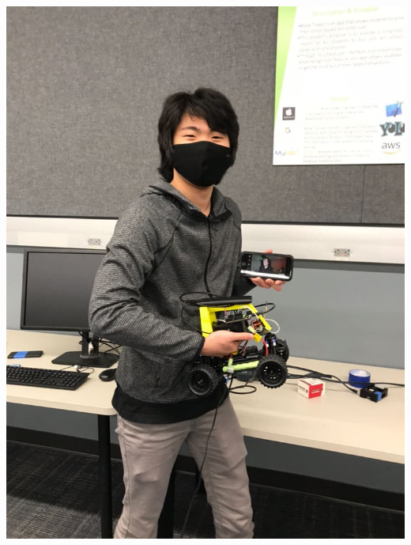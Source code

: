 \documentclass[11pt]{article}
\begin{document}
\begin{enumerate}
\begin{center}
\includegraphics[width=.9\linewidth]{./jengatkins_1.jpg}
\end{center}
\end{enumerate}
\end{document}
